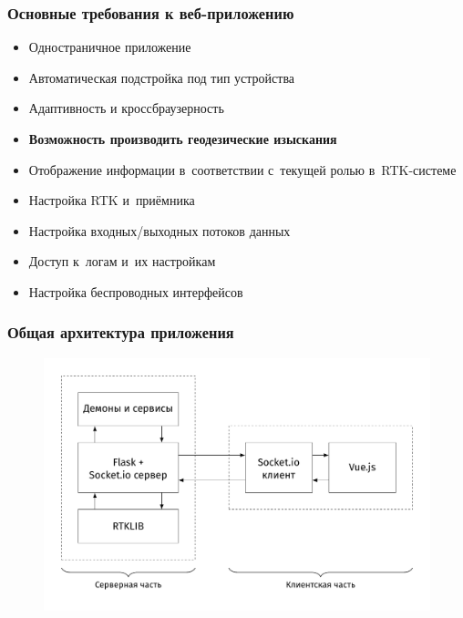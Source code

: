 \documentclass[xetex,с,aspectratio=169]{beamer}
\begin{document}
%
%
\begin{frame}
  \frametitle{Основные требования к веб-приложению}
  
  \large
  
  \begin{itemize}
    \item Одностраничное приложение
    \item Автоматическая подстройка под тип устройства
    \item Адаптивность и кроссбраузерность
  \end{itemize}
  \begin{center}
    \vskip -0.7cm
    \color{ifmoblue}{\rule{.5\textwidth}{0.5pt}}
  \end{center}
  \vskip -0.5cm
  \begin{itemize}
    \item \textbf{Возможность производить геодезические изыскания}
    \item Отображение информации в~соответствии с~текущей ролью в~RTK-системе
    \item Настройка RTK и~приёмника
    \item Настройка входных/выходных потоков данных
    \item Доступ к~логам и~их настройкам
    \item Настройка беспроводных интерфейсов
  \end{itemize}
\end{frame}


%
%
\begin{frame}
  \frametitle{Общая архитектура приложения}
  \vskip -0.5cm
  \begin{figure}[h]
    \centering
    \includegraphics[width=.75\textwidth]{../img/tikz/system-architecture/pic_sans_no-border}
  \end{figure}
\end{frame}
\end{document}
